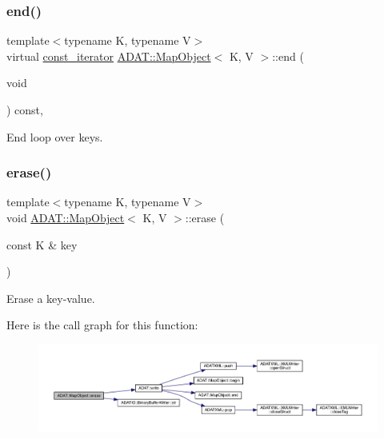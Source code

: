 \subsubsection{\texorpdfstring{end()}{end()}\hspace{0.1cm}{\footnotesize\ttfamily [2/2]}}
{\footnotesize\ttfamily template$<$typename K, typename V$>$ \\
virtual \mbox{\hyperlink{classADAT_1_1MapObject_a4622cd7d3b6fed18fe226d28091cc6c8}{const\+\_\+iterator}} \mbox{\hyperlink{classADAT_1_1MapObject}{A\+D\+A\+T\+::\+Map\+Object}}$<$ K, V $>$\+::end (\begin{DoxyParamCaption}\item[{void}]{ }\end{DoxyParamCaption}) const\hspace{0.3cm}{\ttfamily [inline]}, {\ttfamily [virtual]}}



End loop over keys. 

\mbox{\label{classADAT_1_1MapObject_aa93bbf650a37c70e91904c9e7566eb6f}} 
\subsubsection{\texorpdfstring{erase()}{erase()}\hspace{0.1cm}{\footnotesize\ttfamily [1/2]}}
{\footnotesize\ttfamily template$<$typename K, typename V$>$ \\
void \mbox{\hyperlink{classADAT_1_1MapObject}{A\+D\+A\+T\+::\+Map\+Object}}$<$ K, V $>$\+::erase (\begin{DoxyParamCaption}\item[{const K \&}]{key }\end{DoxyParamCaption})\hspace{0.3cm}{\ttfamily [inline]}}



Erase a key-\/value. 

Here is the call graph for this function\+:
\nopagebreak
\begin{figure}[H]
\begin{center}
\leavevmode
\includegraphics[width=350pt]{da/d29/classADAT_1_1MapObject_aa93bbf650a37c70e91904c9e7566eb6f_cgraph}
\end{center}
\end{figure}
\mbox{\label{classADAT_1_1MapObject_aa93bbf650a37c70e91904c9e7566eb6f}} 
